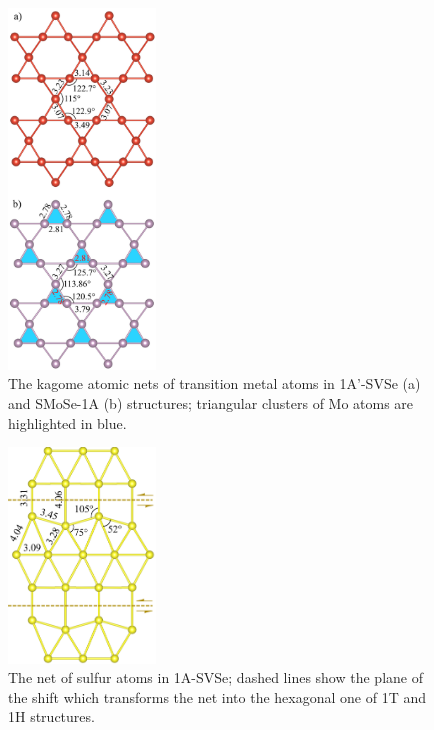 \documentclass[a4paperm]{article}
\begin{document}
\begin{figure}
	\includegraphics [width=0.35\textwidth]{airss1_tm.png}
	\caption{The kagome atomic nets of transition metal atoms in 1A'-SVSe (a) and SMoSe-1A (b) structures; triangular clusters of Mo atoms are highlighted in blue.} 
\label{airss1_tm}
\end{figure}

\begin{figure}
	\includegraphics[width=0.35\textwidth]{airss1v_s.png}
	\caption{The net of sulfur atoms in 1A-SVSe; dashed lines show the plane of the shift which transforms the net into the hexagonal one of 1T and 1H structures.}
\label{airss1_s}
\end{figure}
\end{document}
